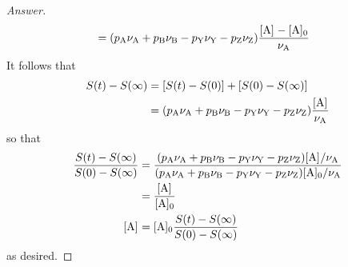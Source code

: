 \documentclass[../psets.tex]{subfiles}
\begin{document}
\begin{enumerate}[label={\textbf{28-\arabic*.}},leftmargin=3.5em]
\begin{proof}[Answer]
\begin{align*}
            &= (p_{\ce{A}}\nu_{\ce{A}}+p_{\ce{B}}\nu_{\ce{B}}-p_{\ce{Y}}\nu_{\ce{Y}}-p_{\ce{Z}}\nu_{\ce{Z}})\frac{\cnc{A}-\cnc[0]{A}}{\nu_{\ce{A}}}
        \end{align*}
        It follows that
        \begin{align*}
            S(t)-S(\infty) &= [S(t)-S(0)]+[S(0)-S(\infty)]\\
            &= (p_{\ce{A}}\nu_{\ce{A}}+p_{\ce{B}}\nu_{\ce{B}}-p_{\ce{Y}}\nu_{\ce{Y}}-p_{\ce{Z}}\nu_{\ce{Z}})\frac{\cnc{A}}{\nu_{\ce{A}}}
        \end{align*}
        so that
        \begin{align*}
            \frac{S(t)-S(\infty)}{S(0)-S(\infty)} &= \frac{(p_{\ce{A}}\nu_{\ce{A}}+p_{\ce{B}}\nu_{\ce{B}}-p_{\ce{Y}}\nu_{\ce{Y}}-p_{\ce{Z}}\nu_{\ce{Z}})\cnc{A}/\nu_{\ce{A}}}{(p_{\ce{A}}\nu_{\ce{A}}+p_{\ce{B}}\nu_{\ce{B}}-p_{\ce{Y}}\nu_{\ce{Y}}-p_{\ce{Z}}\nu_{\ce{Z}})\cnc[0]{A}/\nu_{\ce{A}}}\\
            &= \frac{\cnc{A}}{\cnc[0]{A}}\\
            \cnc{A} &= \cnc[0]{A}\frac{S(t)-S(\infty)}{S(0)-S(\infty)}
        \end{align*}
        as desired.
    \end{proof}
\end{enumerate}
\end{document}
